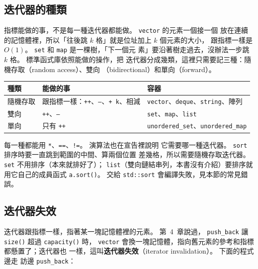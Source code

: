 \subsection{迭代器的種類}

指標能做的事，不是每一種迭代器都能做。 \texttt{vector} 的元素一個接一個
放在連續的記憶體裡，所以「往後跳 $k$ 格」就是位址加上 $k$ 個元素的大小，
跟指標一樣是 $O(1)$。 \texttt{set} 和 \texttt{map} 是一棵樹，「下一個元
素」要沿著樹走過去，沒辦法一步跳 $k$ 格。 標準函式庫依照能做的操作，把
迭代器分成幾類，這裡只需要記三種：隨機存取（random access）、雙向
（bidirectional）和單向（forward）。

\begin{center}
\begin{tabular}{lll}
\toprule
種類 & 能做的事 & 容器 \\
\midrule
隨機存取 & 跟指標一樣：\texttt{++}、\texttt{--}、\texttt{+ k}、相減 & \texttt{vector}、\texttt{deque}、\texttt{string}、陣列 \\
雙向 & \texttt{++}、\texttt{--} & \texttt{set}、\texttt{map}、\texttt{list} \\
單向 & 只有 \texttt{++} & \texttt{unordered\_set}、\texttt{unordered\_map} \\
\bottomrule
\end{tabular}
\end{center}

每一種都能用 \texttt{*}、\texttt{==}、\texttt{!=}。 演算法也在宣告裡說明
它需要哪一種迭代器。 \texttt{sort} 排序時要一直跳到範圍的中間、算兩個位置
差幾格，所以需要隨機存取迭代器。 \texttt{set} 不用排序（本來就排好了）；
\texttt{list}（雙向鏈結串列，本書沒有介紹）要排序就用它自己的成員函式
\texttt{a.sort()}。 交給 \texttt{std::sort} 會編譯失敗，見本節的常見錯誤。

\subsection{迭代器失效}

迭代器跟指標一樣，指著某一塊記憶體裡的元素。 第~4~章說過，
\texttt{push\_back} 讓 \texttt{size()} 超過 \texttt{capacity()} 時，
\texttt{vector} 會換一塊記憶體，指向舊元素的參考和指標都懸置了；迭代器也
一樣，這叫\textbf{迭代器失效}（iterator invalidation）。 下面的程式邊走
訪邊 \texttt{push\_back}：


